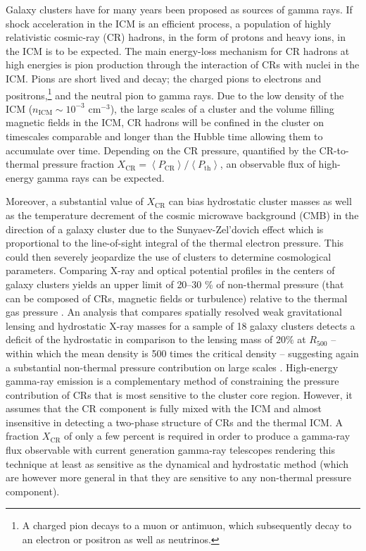 \documentclass[12pt,manuscript]{aastex}
\newcommand{\expval}[1]{\left\langle #1 \right\rangle}
\newcommand{\CR}{\mathrm{CR}}
\begin{document}
Galaxy clusters have for many years been proposed as sources of gamma rays. If shock acceleration in the ICM is an efficient process, a population of highly relativistic cosmic-ray (CR) hadrons, in the form of protons and heavy ions, in the ICM is to be expected. The main energy-loss mechanism for CR hadrons at high energies is pion production through the interaction of CRs with nuclei in the ICM. Pions are short lived and decay; the charged pions to electrons and positrons,\footnote{A charged pion decays to a muon or antimuon, which subsequently decay to an electron or positron as well as neutrinos.} and the neutral pion to gamma rays. Due to the low density of the ICM ($n_{\mathrm{ICM}}\sim 10^{-3}$ cm$^{-3}$), the large scales of a cluster and the volume filling magnetic fields in the ICM, CR hadrons will be confined in the cluster on timescales comparable and longer than the Hubble time \citep[][]{article:Volk_etal:1996, article:Berezinsky_etal:1997} allowing them to accumulate over time.  Depending on the CR pressure, quantified by the CR-to-thermal pressure fraction $X_\CR=\expval{P_{\CR}}/\expval{P_{\mathrm{th}}}$, an observable flux of high-energy gamma rays can be expected.

Moreover, a substantial value of $X_\CR$ can bias hydrostatic cluster masses as well as the temperature decrement of the cosmic microwave background (CMB) in the direction of a galaxy cluster due to the Sunyaev-Zel'dovich effect which is proportional to the line-of-sight integral of the thermal electron pressure. This could then severely jeopardize the use of clusters to determine cosmological parameters. Comparing X-ray and optical potential profiles in the centers of galaxy clusters yields an upper limit of 20--30 \% of non-thermal pressure (that can be composed of CRs, magnetic fields or turbulence) relative to the thermal gas pressure \citep{article:Churazov_etal:2008, article:Churazov_etal:2010}. An analysis that compares spatially resolved weak gravitational lensing and hydrostatic X-ray masses for a sample of 18 galaxy clusters detects a deficit of the hydrostatic in comparison to the lensing mass of $20 \%$ at $R_{500}$ -- within which the mean density is 500 times the critical density -- suggesting again a substantial non-thermal pressure contribution on large scales \citep{article:Mahdavi_etal:2008}. High-energy gamma-ray emission is a complementary method of constraining the pressure contribution of CRs that is most sensitive to the cluster core region. However, it assumes that the CR component is fully mixed with the ICM and almost insensitive in detecting a two-phase structure of CRs and the thermal ICM.  A fraction $X_\CR$ of only a few percent is required in order to produce a gamma-ray flux observable with current generation gamma-ray telescopes rendering this technique at least as sensitive as the dynamical and hydrostatic method (which are however more general in that they are sensitive to any non-thermal pressure component).
\end{document}
